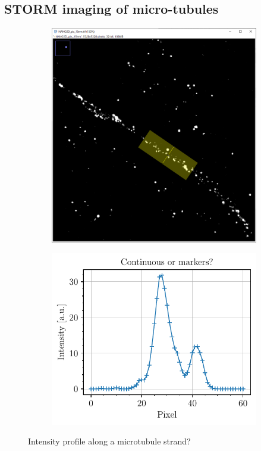 \subsection{STORM imaging of micro-tubules}
\begin{figure}[htbp]
    \begin{subfigure}{0.5\textwidth}
        \includegraphics[width=\textwidth]{figures/microtubules_width_acquisition.PNG}
        \caption{}
        \label{fig:microtubules_width_acquisition}
    \end{subfigure}
    \begin{subfigure}{0.5\textwidth}
        \includegraphics[scale=1]{figures/microtubules_width.pdf}
        \caption{}
        \label{fig:microtubules_width_analysis}
    \end{subfigure}
    \label{fig:microtubules_width}
    \caption{Intensity profile along a microtubule strand?}
\end{figure}


